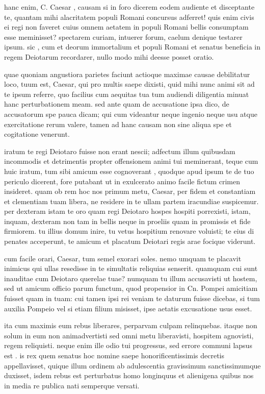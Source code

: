  hanc enim, C. Caesar , causam si in foro dicerem eodem audiente et disceptante te, quantam mihi alacritatem populi Romani concursus adferret! quis enim civis ei regi non faveret cuius omnem aetatem in populi Romani bellis consumptam esse meminisset? spectarem curiam, intuerer forum, caelum denique testarer ipsum. sic , cum et deorum immortalium et populi Romani et senatus beneficia in regem Deiotarum recordarer, nullo modo mihi deesse posset oratio.

 quae quoniam angustiora parietes faciunt actioque maximae causae debilitatur loco, tuum est, Caesar, qui pro multis saepe dixisti, quid mihi nunc animi sit ad te ipsum referre, quo facilius cum aequitas tua tum audiendi diligentia minuat hanc perturbationem meam. sed ante quam de accusatione ipsa dico, de accusatorum spe pauca dicam; qui cum videantur neque ingenio neque usu atque exercitatione rerum valere, tamen ad hanc causam non sine aliqua spe et cogitatione venerunt.

 iratum te regi Deiotaro fuisse non erant nescii; adfectum illum quibusdam incommodis et detrimentis propter offensionem animi tui meminerant, teque cum huic iratum, tum sibi amicum esse cognoverant , quodque apud ipsum te de tuo periculo dicerent, fore putabant ut in exulcerato animo facile fictum crimen insideret. quam ob rem hoc nos primum metu, Caesar, per fidem et constantiam et clementiam tuam libera, ne residere in te ullam partem iracundiae suspicemur. per dexteram istam te oro quam regi Deiotaro hospes hospiti porrexisti, istam, inquam, dexteram non tam in bellis neque in proeliis quam in promissis et fide firmiorem. tu illius domum inire, tu vetus hospitium renovare voluisti; te eius di penates acceperunt, te amicum et placatum Deiotari regis arae focique viderunt.

 cum facile orari, Caesar, tum semel exorari soles. nemo umquam te placavit inimicus qui ullas resedisse in te simultatis reliquias senserit. quamquam cui sunt inauditae cum Deiotaro querelae tuae? numquam tu illum accusavisti ut hostem, sed ut amicum officio parum functum, quod propensior in Cn. Pompei amicitiam fuisset quam in tuam: cui tamen ipsi rei veniam te daturum fuisse dicebas, si tum auxilia Pompeio vel si etiam filium misisset, ipse aetatis excusatione usus esset.

 ita cum maximis eum rebus liberares, perparvam culpam relinquebas. itaque non solum in eum non animadvertisti sed omni metu liberavisti, hospitem agnovisti, regem reliquisti. neque enim ille odio tui progressus, sed errore communi lapsus est . is rex quem senatus hoc nomine saepe honorificentissimis decretis appellavisset, quique illum ordinem ab adulescentia gravissimum sanctissimumque duxisset, isdem rebus est perturbatus homo longinquus et alienigena quibus nos in media re publica nati semperque versati.

